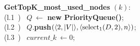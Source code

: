 \begin{itemize}
\begin{itemize}

	\end{itemize}


	\begin{algorithm}[ht]
		\begin{center}
			\begin{minipage}{0.70\textwidth}
				\begin{code}
					\textbf{GetTopK\_most\_used\_nodes} $(k)$: \\
					\>(l.1~) \> ~$ Q ~\leftarrow$ \textbf{new PriorityQueue()}; \\
					\>(l.2~) \> ~$ Q .$\textbf{push$(\langle2, |V|\rangle, \langle\operatorname{select}_1(D,2), n\rangle)$}; \\
					\>(l.3~) \> ~$ current\_k ~\leftarrow 0$; \\%
					

\end{code}
\end{minipage}
\end{center}
\end{algorithm}
\end{itemize}
